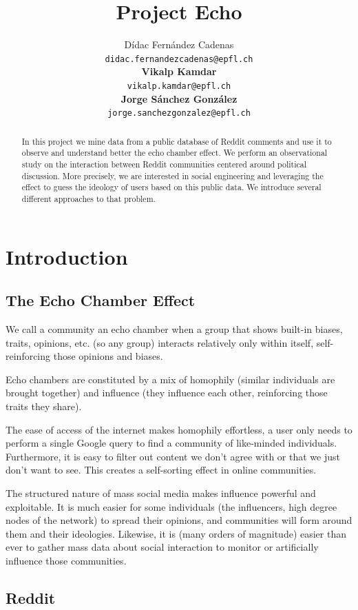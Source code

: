 \documentclass[11pt]{article}
\title{Project Echo}
\author{
Dídac Fernández Cadenas\\
{\tt didac.fernandezcadenas@epfl.ch} \\
\textbf{Vikalp Kamdar}\\
{\tt vikalp.kamdar@epfl.ch} \\
\textbf{Jorge Sánchez González}\\
{\tt jorge.sanchezgonzalez@epfl.ch} \\}
\date{}
\begin{document}
\maketitle
\begin{abstract}
 In this project we mine data from a public database of Reddit comments and use it to observe and understand better the echo chamber effect. We perform an observational study on the interaction between Reddit communities centered around political discussion. More precisely, we are interested in social engineering and leveraging the effect to guess the ideology of users based on this public data. We introduce several different approaches to that problem.
\end{abstract}

\section{Introduction}

\subsection{The Echo Chamber Effect}

We call a community an echo chamber when a group that shows built-in biases, traits, opinions, etc. (so any group) interacts relatively only within itself, self-reinforcing those opinions and biases.

Echo chambers are constituted by a mix of homophily (similar individuals are brought together) and influence (they influence each other, reinforcing those traits they share). 

The ease of access of the internet makes homophily effortless, a user only needs to perform a single Google query to find a community of like-minded individuals. Furthermore, it is easy to filter out content we don't agree with or that we just don't want to see. This creates a self-sorting effect in online communities.

The structured nature of mass social media makes influence powerful and exploitable. It is much easier for some individuals (the influencers, high degree nodes of the network) to spread their opinions, and communities will form around them and their ideologies. Likewise, it is (many orders of magnitude) easier than ever to gather mass data about social interaction to monitor or artificially influence those communities.

\subsection{Reddit}
\end{document}
